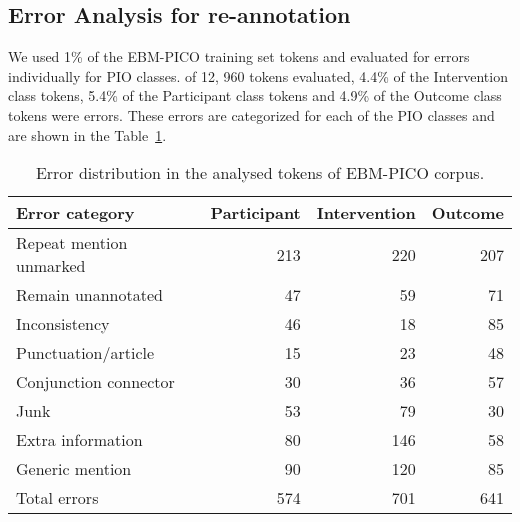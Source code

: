 \documentclass[10.7pt,]{article}
\begin{document}
%
%
%
\subsection{Error Analysis for re-annotation}\label{subsec:err}
%
We used 1\% of the EBM-PICO training set tokens and evaluated for errors individually for PIO classes.
of 12, 960 tokens evaluated, 4.4\% of the Intervention class tokens, 5.4\% of the Participant class tokens and 4.9\% of the Outcome class tokens were errors.
These errors are categorized for each of the PIO classes and are shown in the Table~\ref{tab:errordist}.
%

\begin{table}[!ht]
    \centering
    \begin{tabular}{|l|r|r|r|}
    \hline
        Error category & Participant & Intervention & Outcome \\ \hline
        Repeat mention unmarked & 213 & 220 & 207 \\ 
        Remain unannotated & 47 & 59 & 71 \\ 
        Inconsistency & 46 & 18 & 85 \\ 
        Punctuation/article & 15 & 23 & 48 \\ 
        Conjunction connector & 30 & 36 & 57 \\ 
        Junk & 53 & 79 & 30 \\ 
        Extra information & 80 & 146 & 58 \\ 
        Generic mention & 90 & 120 & 85 \\ \hline
        Total errors & 574 & 701 & 641 \\ \hline
    \end{tabular}
    \caption{\label{tab:errordist} Error distribution in the analysed tokens of EBM-PICO corpus.}
\end{table}
\end{document}
